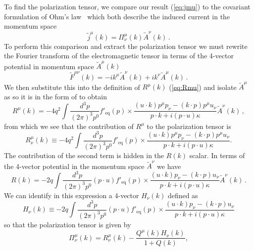 To find the polarization tensor, we compare our result (\ref{eq:jmu}) to the covariant formulation of Ohm's law~\cite{Starke:2014tfa} which both describe the induced current in the momentum space
\begin{equation}\label{eq:ohm}
\widetilde{j}^\mu(k) = \Pi^\mu_\nu(k) \widetilde{A}^\nu(k)\,.
\end{equation}
To perform this comparison and extract the polarization tensor we must rewrite the Fourier transform of the electromagnetic tensor in terms of the 4-vector potential in momentum space $\widetilde{A}^\mu(k)$
\begin{equation}\label{eq:ftfmunu}
\widetilde{F}^{\mu\nu}(k) = -i k^\mu \widetilde{A}^\nu(k) + i k^\nu \widetilde{A}^\mu(k)\,.
\end{equation}
We then substitute this into the definition of $R^\mu(k)$ (\ref{eq:Rmu}) and isolate $\widetilde{A}^\mu$ as so it is in the form of  to obtain \cite{Formanek:2021blc}
\begin{equation}
R^\mu(k) = - 4q^2 \int \frac{d^3p}{(2\pi)^3p^0} f'_\mathrm{eq}(p)
\times \frac{(u\cdot k)p^\mu p_\nu - (k \cdot p)p^\mu u_\nu}{p\cdot k + i (p \cdot u) \kappa} \widetilde{A}^\nu(k)\,,
\end{equation}
from which we see that the contribution of $R^\mu$ to the polarization tensor is
\begin{equation}\label{eq:Rmunu}
R^\mu_\nu(k) \equiv - 4q^2 \int \frac{d^3p}{(2\pi)^3p^0} f'_\mathrm{eq}(p)
\times\frac{(u\cdot k)p^\mu p_\nu - (k \cdot p)p^\mu u_\nu}{p\cdot k + i (p \cdot u) \kappa}.
\end{equation}
The contribution of the second term is hidden in the $R(k)$ scalar. In terms of the 4-vector potential in the momentum space $\widetilde{A}^\nu$ we have
\begin{equation}
R(k) = - 2q \int \frac{d^3p}{(2\pi)^3p^0}(p \cdot u)f'_\mathrm{eq}(p)
\times\frac{(u\cdot k)p_\nu - (k \cdot p)u_\nu}{p\cdot k + i (p \cdot u) \kappa}\widetilde{A}^\nu(k)\,.
\end{equation}
We can identify in this expression a 4-vector $H_\nu(k)$ defined as
\begin{equation}\label{eq:Hnu}
H_\nu(k) \equiv - 2q \int \frac{d^3p}{(2\pi)^3p^0}(p \cdot u)f'_\mathrm{eq}(p)
\times\frac{(u\cdot k)p_\nu - (k \cdot p)u_\nu}{p\cdot k + i (p \cdot u) \kappa}
\end{equation}
so that the polarization tensor is given by
\begin{equation}\label{eq:pimunu}
\boxed{\Pi^\mu_\nu(k) = R^\mu_\nu(k) - \frac{Q^\mu(k) H_\nu(k)}{1+Q(k)},}
\end{equation}
